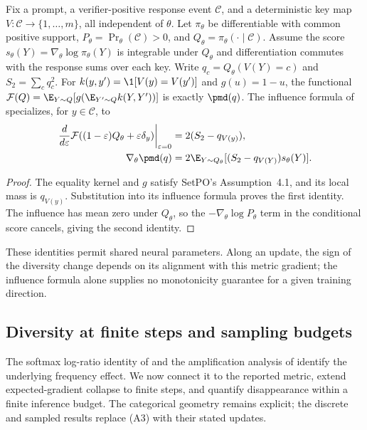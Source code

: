 \begin{corollary}
\enforcehalffinalproseline
\label{cor:pcmd-setpo-neural}
Fix a prompt, a verifier-positive response event $\mathcal C$, and a
deterministic key map $V:\mathcal C\to\{1,\ldots,m\}$, all independent
of $\theta$. Let $\pi_\theta$ be differentiable with common positive support,
$P_\theta=\Pr_\theta(\mathcal C)>0$, and
$Q_\theta=\pi_\theta(\cdot\mid\mathcal C)$. Assume the score
$s_\theta(Y)=\nabla_\theta\log\pi_\theta(Y)$ is integrable under $Q_\theta$
and differentiation commutes with the response sums over each key.
Write $q_c=Q_\theta(V(Y)=c)$ and $S_2=\sum_cq_c^2$.
For $k(y,y')=\1[V(y)=V(y')]$ and $g(u)=1-u$, the functional
$\mathcal F(Q)=\E_{Y\sim Q}[g(\E_{Y'\sim Q}k(Y,Y'))]$ is exactly
$\pmd(q)$. The influence formula of
\citet[Theorem~4.2, v1]{li2026setpo} specializes, for $y\in\mathcal C$, to
\begin{align}
 \left.\frac{d}{d\varepsilon}
  \mathcal F((1-\varepsilon)Q_\theta+\varepsilon\delta_y)
  \right|_{\varepsilon=0}
 &=2(S_2-q_{V(y)}),\label{eq:pcmd-setpo-influence}\\
 \nabla_\theta\pmd(q)
 &=2\E_{Y\sim Q_\theta}
       [(S_2-q_{V(Y)})s_\theta(Y)].
 \label{eq:pcmd-neural-gradient}
\end{align}
\end{corollary}
\begin{proof}
\enforcehalffinalproseline
The equality kernel and $g$ satisfy SetPO's Assumption~4.1, and its local
mass is $q_{V(y)}$. Substitution into its influence formula proves the first
identity. The influence has mean zero under $Q_\theta$, so the
$-\nabla_\theta\log P_\theta$ term in the conditional score cancels,
giving the second identity.
\end{proof}
These identities permit shared neural parameters. Along an update, the
sign of the diversity change depends on its alignment with this metric
gradient; the influence formula alone supplies no monotonicity guarantee
for a given training direction.

\subsection{Diversity at finite steps and sampling budgets}
\label{app:finite-time-diversity}

The softmax log-ratio identity of
\citet[Theorem~3.1 and App.~A.1]{sinha2026expected} and the amplification
analysis of \citet[Section~4.2]{lochab2026ucpo} identify the underlying
frequency effect. We now connect it to the reported \pmd{} metric, extend
expected-gradient collapse to finite steps, and quantify disappearance within
a finite inference budget. The categorical geometry remains explicit;
the discrete and sampled results replace (A3) with their stated updates.

